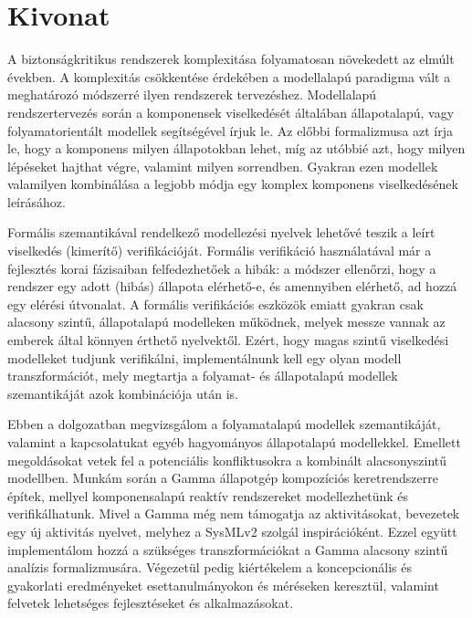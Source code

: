 \setcounter{page}{1}

\selecthungarian

\chapter*{Kivonat}

A biztonságkritikus rendszerek komplexitása folyamatosan növekedett az elmúlt években. A komplexitás csökkentése érdekében a modellalapú paradigma vált a meghatározó módszerré ilyen rendszerek tervezéshez. Modellalapú rendszertervezés során a komponensek viselkedését általában állapotalapú, vagy folyamatorientált modellek segítségével írjuk le. Az előbbi formalizmusa azt írja le, hogy a komponens milyen állapotokban lehet, míg az utóbbié azt, hogy milyen lépéseket hajthat végre, valamint milyen sorrendben. Gyakran ezen modellek valamilyen kombinálása a legjobb módja egy komplex komponens viselkedésének leírásához. 

Formális szemantikával rendelkező modellezési nyelvek lehetővé teszik a leírt viselkedés (kimerítő) verifikációját. Formális verifikáció használatával már a fejlesztés korai fázisaiban felfedezhetőek a hibák: a módszer ellenőrzi, hogy a rendszer egy adott (hibás) állapota elérhető-e, és amennyiben elérhető, ad hozzá egy elérési útvonalat. A formális verifikációs eszközök emiatt gyakran csak alacsony szintű, állapotalapú modelleken működnek, melyek messze vannak az emberek által könnyen érthető nyelvektől. Ezért, hogy magas szintű viselkedési modelleket tudjunk verifikálni, implementálnunk kell egy olyan modell transzformációt, mely megtartja a folyamat- és állapotalapú modellek szemantikáját azok kombinációja után is. 

Ebben a dolgozatban megvizsgálom a folyamatalapú modellek szemantikáját, valamint a kapcsolatukat egyéb hagyományos állapotalapú modellekkel. Emellett megoldásokat vetek fel a potenciális konfliktusokra a kombinált alacsonyszintű modellben. Munkám során a Gamma állapotgép kompozíciós keretrendszerre építek, mellyel komponensalapú reaktív rendszereket modellezhetünk és verifikálhatunk. Mivel a Gamma még nem támogatja az aktivitásokat, bevezetek egy új aktivitás nyelvet, melyhez a SysMLv2 szolgál inspirációként. Ezzel együtt implementálom hozzá a szükséges transzformációkat a Gamma alacsony szintű analízis formalizmusára. Végezetül pedig kiértékelem a koncepcionális és gyakorlati eredményeket esettanulmányokon és méréseken keresztül, valamint felvetek lehetséges fejlesztéseket és alkalmazásokat. 


